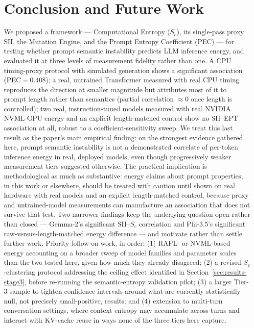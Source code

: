 \documentclass[conference]{IEEEtran}
\begin{document}
\section{Conclusion and Future Work}
\label{sec:conclusion}
We proposed a framework --- Computational Entropy ($S_c$), its
single-pass proxy SII, the Mutation Engine, and the Prompt Entropy
Coefficient (PEC) --- for testing whether prompt semantic instability
predicts LLM inference energy, and evaluated it at three levels of
measurement fidelity rather than one. A CPU timing-proxy protocol with
simulated generation shows a significant association (PEC$=0.408$); a
real, untrained Transformer measured with real CPU timing reproduces
the direction at smaller magnitude but attributes most of it to prompt
length rather than semantics (partial correlation $\approx0$ once
length is controlled); two real, instruction-tuned models measured
with real NVIDIA NVML GPU energy and an explicit length-matched
control show no SII--EPT association at all, robust to a
coefficient-sensitivity sweep. We treat this last result as the
paper's main empirical finding: on the strongest evidence gathered
here, prompt semantic instability is not a demonstrated correlate of
per-token inference energy in real, deployed models, even though
progressively weaker measurement tiers suggested otherwise. The
practical implication is methodological as much as substantive: energy
claims about prompt properties, in this work or elsewhere, should be
treated with caution until shown on real hardware with real models and
an explicit length-matched control, because proxy and untrained-model
measurements can manufacture an association that does not survive that
test. Two narrower findings keep the underlying question open rather
than closed --- Gemma-2's significant SII--$S_c$ correlation and
Phi-3.5's significant raw-versus-length-matched energy difference ---
and motivate rather than settle further work.
Priority follow-on work, in order: (1) RAPL- or NVML-based energy
accounting on a broader sweep of model families and parameter scales
than the two tested here, given how much they already disagreed; (2)
a revised $S_c$-clustering protocol addressing the ceiling effect
identified in Section~\ref{sec:results-stage3}, before re-running the
semantic-entropy validation pilot; (3) a larger Tier-3 sample to
tighten confidence intervals around what are currently statistically
null, not precisely small-positive, results; and (4) extension to
multi-turn conversation settings, where context entropy may accumulate
across turns and interact with KV-cache reuse in ways none of the
three tiers here capture.
\end{document}
